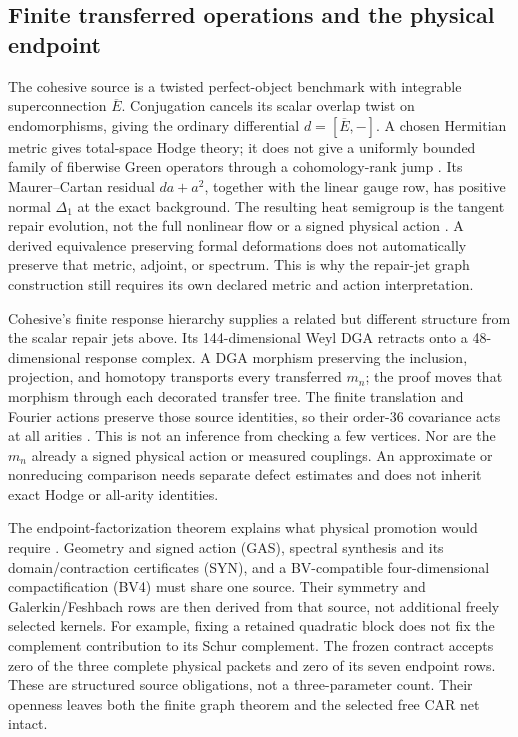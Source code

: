 \documentclass[11pt,a4paper]{article}
\begin{document}
\subsection{Finite transferred operations and the physical endpoint}
\label{sec:finite-transfer-consumer}

The cohesive source is a twisted perfect-object benchmark with integrable
superconnection \(\overline E\). Conjugation cancels its scalar overlap
twist on endomorphisms, giving the ordinary differential
\(d=[\overline E,-]\). A chosen Hermitian metric gives total-space Hodge
theory; it does not give a uniformly bounded family of fiberwise Green
operators through a cohomology-rank jump \cite{FrozenCohesive,Cohesive14}.
Its Maurer--Cartan residual \(da+a^2\), together with the linear gauge row,
has positive normal \(\Delta_1\) at the exact background. The resulting
heat semigroup is the tangent repair evolution, not the full nonlinear flow
or a signed physical action \cite{FrozenCohesiveMC}. A derived equivalence
preserving formal deformations does not automatically preserve that metric,
adjoint, or spectrum. This is why the repair-jet graph construction still
requires its own declared metric and action interpretation.

Cohesive's finite response hierarchy supplies a related but different
structure from the scalar repair jets above. Its 144-dimensional Weyl DGA
retracts onto a 48-dimensional response complex. A DGA morphism preserving
the inclusion, projection, and homotopy transports every transferred
\(m_n\); the proof moves that morphism through each decorated transfer tree.
The finite translation and Fourier actions preserve those source identities,
so their order-36 covariance acts at all arities
\cite{Cohesive14,FrozenAllArity}. This is not an inference from checking a few
vertices. Nor are the \(m_n\) already a signed physical action or measured
couplings. An approximate or nonreducing comparison needs separate defect
estimates and does not inherit exact Hodge or all-arity identities.

The endpoint-factorization theorem explains what physical promotion would
require \cite{FrozenEndpoint}. Geometry and signed action (GAS), spectral
synthesis and its domain/contraction certificates (SYN), and a
BV-compatible four-dimensional compactification (BV4) must share one source.
Their symmetry and Galerkin/Feshbach rows are then derived from that source,
not additional freely selected kernels. For example, fixing a retained
quadratic block does not fix the complement contribution to its Schur
complement. The frozen contract accepts zero of the three complete physical
packets and zero of its seven endpoint rows. These are structured source
obligations, not a three-parameter count. Their openness leaves both the
finite graph theorem and the selected free CAR net intact.
\end{document}
